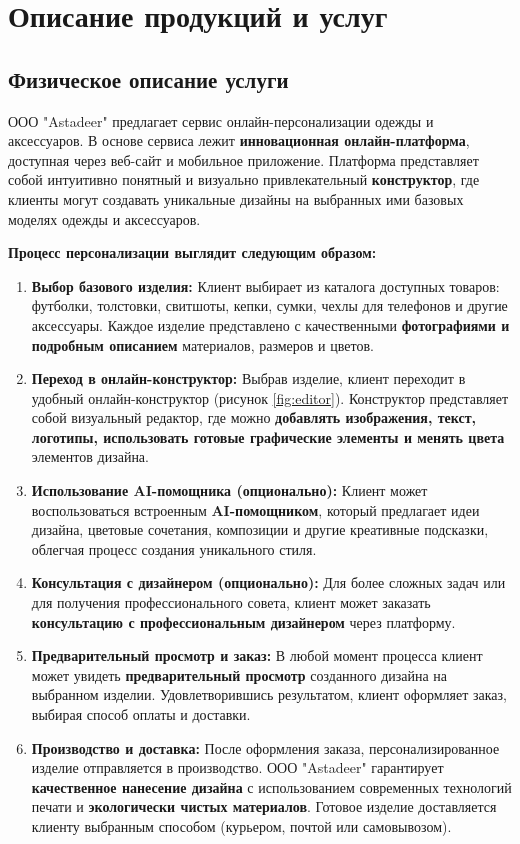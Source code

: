 \section{Описание продукций и услуг}

\subsection{Физическое описание услуги}

ООО "Astadeer" предлагает сервис онлайн-персонализации одежды и аксессуаров.  В основе сервиса лежит \textbf{инновационная онлайн-платформа}, доступная через веб-сайт и мобильное приложение.  Платформа представляет собой интуитивно понятный и визуально привлекательный \textbf{конструктор}, где клиенты могут создавать уникальные дизайны на выбранных ими базовых моделях одежды и аксессуаров.

\vspace{0.3cm}

\textbf{Процесс персонализации выглядит следующим образом:}

\begin{enumerate}[label=\arabic*. ]
    \item  \textbf{Выбор базового изделия:} Клиент выбирает из каталога доступных товаров: футболки, толстовки, свитшоты, кепки, сумки, чехлы для телефонов и другие аксессуары.  Каждое изделие представлено с качественными \textbf{фотографиями и подробным описанием} материалов, размеров и цветов.
    \item  \textbf{Переход в онлайн-конструктор:}  Выбрав изделие, клиент переходит в удобный онлайн-конструктор (рисунок \ref{fig:editor}).  Конструктор представляет собой визуальный редактор, где можно \textbf{добавлять изображения, текст, логотипы, использовать готовые графические элементы и менять цвета} элементов дизайна.
    \item  \textbf{Использование AI-помощника (опционально):}  Клиент может воспользоваться встроенным \textbf{AI-помощником}, который предлагает идеи дизайна, цветовые сочетания, композиции и другие креативные подсказки, облегчая процесс создания уникального стиля.
    \item  \textbf{Консультация с дизайнером (опционально):}  Для более сложных задач или для получения профессионального совета, клиент может заказать \textbf{консультацию с профессиональным дизайнером} через платформу.
    \item  \textbf{Предварительный просмотр и заказ:}  В любой момент процесса клиент может увидеть \textbf{предварительный просмотр} созданного дизайна на выбранном изделии.  Удовлетворившись результатом, клиент оформляет заказ, выбирая способ оплаты и доставки.
    \item  \textbf{Производство и доставка:}  После оформления заказа, персонализированное изделие отправляется в производство.  ООО "Astadeer" гарантирует \textbf{качественное нанесение дизайна} с использованием современных технологий печати и \textbf{экологически чистых материалов}.  Готовое изделие доставляется клиенту выбранным способом (курьером, почтой или самовывозом).
\end{enumerate}

